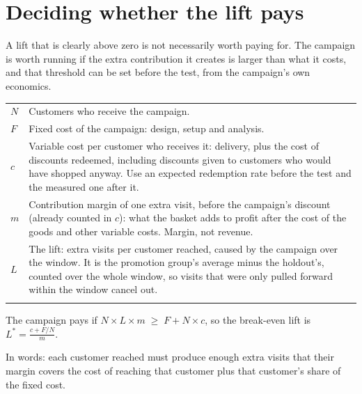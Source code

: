 \documentclass[11pt]{article}
\begin{document}
\section{Deciding whether the lift pays}

A lift that is clearly above zero is not necessarily worth paying for. The campaign is worth running
if the extra contribution it creates is larger than what it costs, and that threshold can be
set before the test, from the campaign's own economics.

\vspace{1pt}
{\small
\renewcommand{\arraystretch}{1.18}
\begin{tabularx}{\textwidth}{@{}>{\centering\arraybackslash}p{0.7cm}Y@{}}
\toprule[0.6pt]
$N$ & Customers who receive the campaign. \\
\midrule
$F$ & Fixed cost of the campaign: design, setup and analysis. \\
\midrule
$c$ & Variable cost per customer who receives it: delivery, plus the cost of discounts redeemed,
including discounts given to customers who would have shopped anyway. Use an expected
redemption rate before the test and the measured one after it. \\
\midrule
$m$ & Contribution margin of one extra visit, before the campaign's discount (already counted in
$c$): what the basket adds to profit after the cost of the goods and other variable costs.
Margin, not revenue. \\
\midrule
$L$ & The lift: extra visits per customer reached, caused by the campaign over the window. It is
the promotion group's average minus the holdout's, counted over the whole window, so visits that
were only pulled forward within the window cancel out. \\
\bottomrule[0.6pt]
\end{tabularx}
}

\vspace{6pt}
\begin{formulabox}
\centering
The campaign pays if\quad
$N \times L \times m \;\ge\; F + N \times c$,\quad
so the break-even lift is\quad
$\displaystyle L^{*} = \frac{c + F/N}{m}.$\par
\vspace{5pt}\raggedright\small
In words: each customer reached must produce enough extra visits that their margin covers the
cost of reaching that customer plus that customer's share of the fixed cost.
\end{formulabox}
\end{document}
